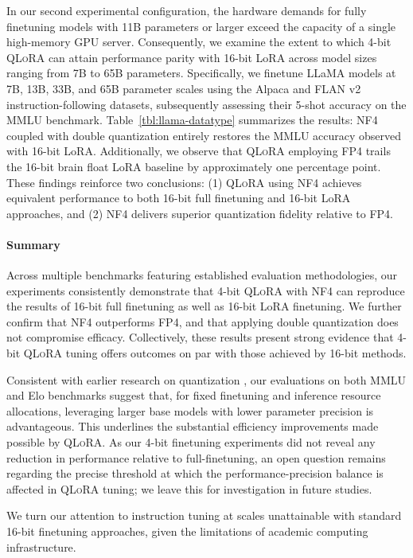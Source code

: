 In our second experimental configuration, the hardware demands for fully finetuning models with 11B parameters or larger exceed the capacity of a single high-memory GPU server. Consequently, we examine the extent to which 4-bit \textsc{QLoRA} can attain performance parity with 16-bit LoRA across model sizes ranging from 7B to 65B parameters. Specifically, we finetune LLaMA models at 7B, 13B, 33B, and 65B parameter scales using the Alpaca and FLAN v2 instruction-following datasets, subsequently assessing their 5-shot accuracy on the MMLU benchmark. Table~\ref{tbl:llama-datatype} summarizes the results: NF4 coupled with double quantization entirely restores the MMLU accuracy observed with 16-bit LoRA. Additionally, we observe that \textsc{QLoRA} employing FP4 trails the 16-bit brain float LoRA baseline by approximately one percentage point. These findings reinforce two conclusions: (1) \textsc{QLoRA} using NF4 achieves equivalent performance to both 16-bit full finetuning and 16-bit LoRA approaches, and (2) NF4 delivers superior quantization fidelity relative to FP4.

\paragraph{Summary} Across multiple benchmarks featuring established evaluation methodologies, our experiments consistently demonstrate that 4-bit \textsc{QLoRA} with NF4 can reproduce the results of 16-bit full finetuning as well as 16-bit LoRA finetuning. We further confirm that NF4 outperforms FP4, and that applying double quantization does not compromise efficacy. Collectively, these results present strong evidence that 4-bit \textsc{QLoRA} tuning offers outcomes on par with those achieved by 16-bit methods.

Consistent with earlier research on quantization \citep{dettmers2022case}, our evaluations on both MMLU and Elo benchmarks suggest that, for fixed finetuning and inference resource allocations, leveraging larger base models with lower parameter precision is advantageous. This underlines the substantial efficiency improvements made possible by \textsc{QLoRA}. As our 4-bit finetuning experiments did not reveal any reduction in performance relative to full-finetuning, an open question remains regarding the precise threshold at which the performance-precision balance is affected in \textsc{QLoRA} tuning; we leave this for investigation in future studies.

We turn our attention to instruction tuning at scales unattainable with standard 16-bit finetuning approaches, given the limitations of academic computing infrastructure.

